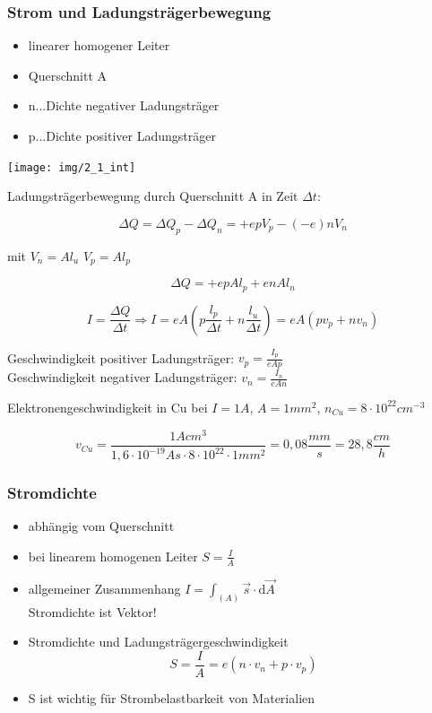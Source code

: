 \subsubsection{Strom und Ladungsträgerbewegung}

\begin{minipage}{0.5\textwidth}
\begin{itemize}
	\item linearer homogener Leiter
	\item Querschnitt A
	\item n...Dichte negativer Ladungsträger
	\item p...Dichte positiver Ladungsträger
\end{itemize}
\end{minipage} \hfill
\begin{minipage}{0.35\textwidth}
\texttt{[image: img/2\_1\_int]}
\end{minipage}


Ladungsträgerbewegung durch Querschnitt A in Zeit $\Delta t$:

$$\Delta Q = \Delta Q_p - \Delta Q_n = +e p V_p - (-e) n V_n$$

mit $V_n = A l_u$ $V_p = A l_p$

$$\Delta Q = +e p A l_p + e n A l_n$$

$$I = \frac{\Delta Q}{\Delta t} \Rightarrow I = e A (p \frac{l_p}{\Delta t} + n \frac{l_u}{\Delta t}) = e A (p v_p + n v_n)$$

Geschwindigkeit positiver Ladungsträger: $v_p = \frac{I_p}{e A p}$\\
Geschwindigkeit negativer Ladungsträger: $v_n = \frac{I_n}{e A n}$

 Elektronengeschwindigkeit in Cu bei $I=1A$, $A=1mm^2$, $n_{Cu} = 8 \cdot 10^{22}cm^{-3}$

$$v_{Cu} = \frac{1 A cm^3}{1,6 \cdot 10^{-19}A s \cdot 8 \cdot 10^{22} \cdot 1mm^2} = 0,08\frac{mm}{s} = 28,8 \frac{cm}{h}$$

\subsubsection{Stromdichte}

\begin{itemize}
	\item abhängig vom Querschnitt
	\item bei linearem homogenen Leiter $S=\frac{I}{A}$
	\item allgemeiner Zusammenhang $I = \int_{(A)} \vec{s} \cdot \mathrm{d}\vec{A}$\\
		\Ra Stromdichte ist Vektor!
	\item Stromdichte und Ladungsträgergeschwindigkeit
		$$S=\frac{I}{A}=e(n \cdot v_n + p \cdot v_p)$$
	\item S ist wichtig für Strombelastbarkeit von Materialien
\end{itemize}

